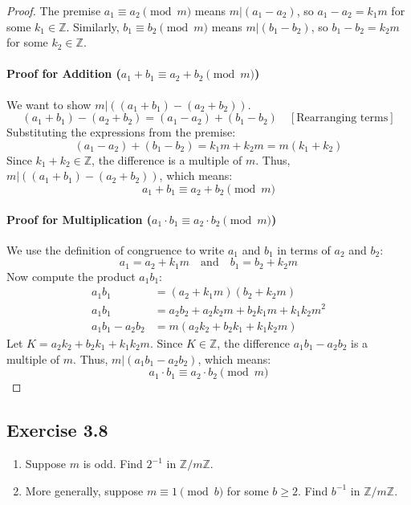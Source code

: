 \begin{proof}
The premise $a_1 \equiv a_2 \pmod{m}$ means $m | (a_1 - a_2)$, so $a_1 - a_2 = k_1 m$ for some $k_1 \in \mathbb{Z}$.
Similarly, $b_1 \equiv b_2 \pmod{m}$ means $m | (b_1 - b_2)$, so $b_1 - b_2 = k_2 m$ for some $k_2 \in \mathbb{Z}$.

\paragraph{Proof for Addition ($a_1+b_1 \equiv a_2+b_2 \pmod{m}$)}
We want to show $m | ((a_1+b_1) - (a_2+b_2))$.
$$ (a_1+b_1) - (a_2+b_2) = (a_1 - a_2) + (b_1 - b_2) \quad [\text{Rearranging terms}] $$
Substituting the expressions from the premise:
$$ (a_1 - a_2) + (b_1 - b_2) = k_1 m + k_2 m = m(k_1 + k_2) $$
Since $k_1+k_2 \in \mathbb{Z}$, the difference is a multiple of $m$.
Thus, $m | ((a_1+b_1) - (a_2+b_2))$, which means:
$$ a_1+b_1 \equiv a_2+b_2 \pmod{m} $$

\paragraph{Proof for Multiplication ($a_1 \cdot b_1 \equiv a_2 \cdot b_2 \pmod{m}$)}
We use the definition of congruence to write $a_1$ and $b_1$ in terms of $a_2$ and $b_2$:
$$ a_1 = a_2 + k_1 m \quad \text{and} \quad b_1 = b_2 + k_2 m $$
Now compute the product $a_1 b_1$:
\begin{align*}
    a_1 b_1 &= (a_2 + k_1 m)(b_2 + k_2 m) \\
    a_1 b_1 &= a_2 b_2 + a_2 k_2 m + b_2 k_1 m + k_1 k_2 m^2 \\
    a_1 b_1 - a_2 b_2 &= m(a_2 k_2 + b_2 k_1 + k_1 k_2 m)
\end{align*}
Let $K = a_2 k_2 + b_2 k_1 + k_1 k_2 m$. Since $K \in \mathbb{Z}$, the difference $a_1 b_1 - a_2 b_2$ is a multiple of $m$.
Thus, $m | (a_1 b_1 - a_2 b_2)$, which means:
$$ a_1 \cdot b_1 \equiv a_2 \cdot b_2 \pmod{m} $$
\end{proof}

\subsection*{Exercise 3.8}
\begin{enumerate}
    \item Suppose $m$ is odd. Find $2^{-1}$ in $\mathbb{Z}/m\mathbb{Z}$.
    \item More generally, suppose $m \equiv 1 \pmod{b}$ for some $b \ge 2$. Find $b^{-1}$ in $\mathbb{Z}/m\mathbb{Z}$.
\end{enumerate}

